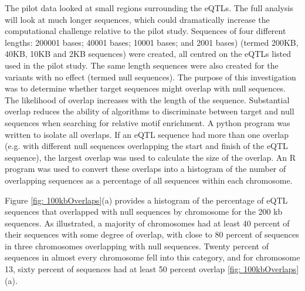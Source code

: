 \documentclass[12pt, onecolumn, oneside]{gsajnl}
\begin{document}
The pilot data looked at small regions surrounding the eQTLs. The full analysis will look at much longer sequences, which could dramatically increase
the computational challenge relative to the pilot study.  Sequences of four different lengths: 200001 bases; 40001 bases; 10001 bases; and 2001 bases) (termed 200KB, 40KB, 10KB and 2KB sequences) were created, all centred on the eQTLs listed used in the pilot study. The same length sequences were also created 
for the variants with no effect (termed null sequences). The purpose of this investigation was to determine whether target sequences might overlap with null sequences. The likelihood of overlap increases with the length of the sequence. Substantial overlap reduces the ability of algorithms to discriminate between target and null sequences when searching for relative motif enrichment. A python program was written to isolate all overlaps. If an eQTL sequence had more than one overlap (e.g. with different null sequences overlapping the start and finish of the eQTL sequence), the largest overlap was used to calculate the size of the overlap. An R program was used to convert these overlaps into a histogram of the number of overlapping sequences as a percentage of all sequences within each chromosome.

Figure \ref{fig: 100kbOverlaps}(a) provides a histogram of the percentage of eQTL sequences that overlapped with null sequences by chromosome for the 200 kb sequences. As illustrated, a majority of chromosomes had at least 40 percent of their sequences with some degree of overlap, with close to 80 percent of sequences in three chromosomes overlapping with null sequences. Twenty percent of sequences in almost every chromosome fell into this category, and for chromosome 13, sixty percent of sequences had at least 50 percent overlap  \ref{fig: 100kbOverlaps}(a).


\end{document}
